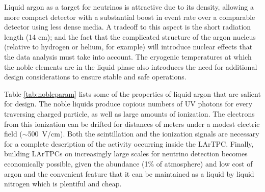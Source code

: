 
Liquid argon as a target for neutrinos is attractive due to its density, allowing a more compact detector with a substantial boost in event rate over a comparable detector using less dense media.  A tradeoff to this aspect is the short radiation length (14 cm); and the fact that the complicated structure of the argon nucleus (relative to hydrogen or helium, for example) will introduce nuclear effects that the data analysis must take into account.  The cryogenic temperatures at which the noble elements are in the liquid phase also introduces the need for additional design considerations to ensure stable and safe operations.

Table \ref{tab:nobleparam} lists some of the properties of liquid argon that are salient for \lartpc design.  
The noble liquids produce copious numbers of UV photons for every traversing charged particle, as well as large amounts of ionization.  The electrons from this ionization can be drifted for distances of meters under a modest electric field ($\sim$500~V/cm).   Both the scintillation and the ionization signals are necessary for a complete description of the activity occurring inside the LArTPC.  Finally, building LArTPCs on increasingly large scales for neutrino detection becomes economically possible, given the abundance (1\% of atmosphere) and low cost of argon and the convenient feature that it can be maintained as a liquid by liquid nitrogen which is plentiful and cheap.    

